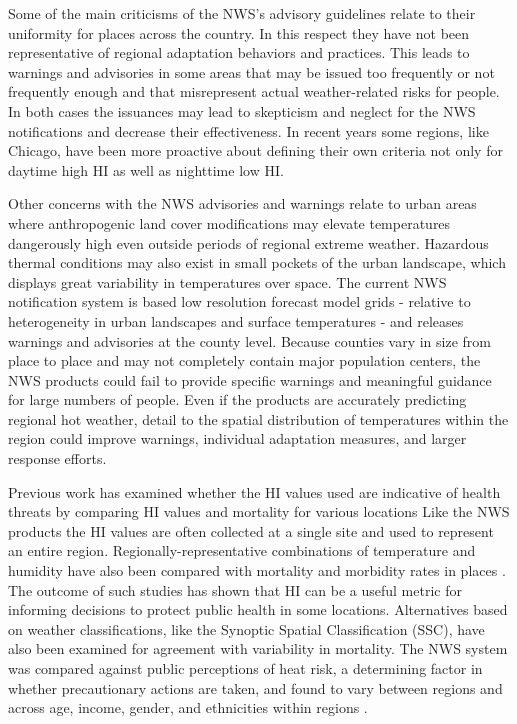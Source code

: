 \documentclass{ametsoc}
\begin{document}
Some of the main criticisms of the NWS's advisory guidelines relate to their uniformity for places across the country. In this respect they have not been representative of regional adaptation behaviors and practices. This leads to warnings and advisories in some areas that may be issued too frequently or not frequently enough and that misrepresent actual weather-related risks for people. In both cases the issuances may lead to skepticism and neglect for the NWS notifications and decrease their effectiveness. In recent years some regions, like Chicago, have been more proactive about defining their own criteria not only for daytime high HI as well as nighttime low HI.

Other concerns with the NWS advisories and warnings relate to urban areas where anthropogenic land cover modifications may elevate temperatures dangerously high even outside periods of regional extreme weather. Hazardous thermal conditions may also exist in small pockets of the urban landscape, which displays great variability in temperatures over space.  The current NWS notification system is based low resolution forecast model grids - relative to heterogeneity in urban landscapes and surface temperatures - and releases warnings and advisories at the county level. Because counties vary in size from place to place and may not completely contain major population centers, the NWS products could fail to provide specific warnings and meaningful guidance for large numbers of people. Even if the products are accurately predicting regional hot weather, detail to the spatial distribution of temperatures within the region could improve warnings, individual adaptation measures, and larger response efforts.

Previous work has examined whether the HI values used are indicative of health threats by comparing HI values and mortality for various locations\citep{Kalkstein1989} Like the NWS products the HI values are often collected at a single site and used to represent an entire region. Regionally-representative combinations of temperature and humidity have also been compared with mortality and morbidity rates in places \citep{Gaffen1998}. The outcome of such studies has shown that HI can be a useful metric for informing decisions to protect public health in some locations. Alternatives based on weather classifications, like the Synoptic Spatial Classification (SSC), have also been examined for agreement with variability in mortality. The NWS system was compared against public perceptions of heat risk, a determining factor in whether precautionary actions are taken, and found to vary between regions and across age, income, gender, and ethnicities within regions \citep{Kalkstein2007}.
\end{document}
